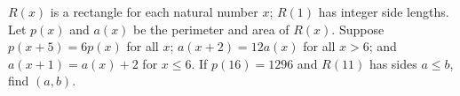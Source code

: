 $R(x)$ is a rectangle for each natural number $x$; $R(1)$ has integer side lengths. Let $p(x)$ and $a(x)$ be the perimeter and area of $R(x)$. Suppose $p(x+5)=6p(x)$ for all $x$; $a(x+2)=12a(x)$ for all $x>6$; and $a(x+1)=a(x)+2$ for $x\le6$. If $p(16)=1296$ and $R(11)$ has sides $a\le b$, find $(a,b)$.
